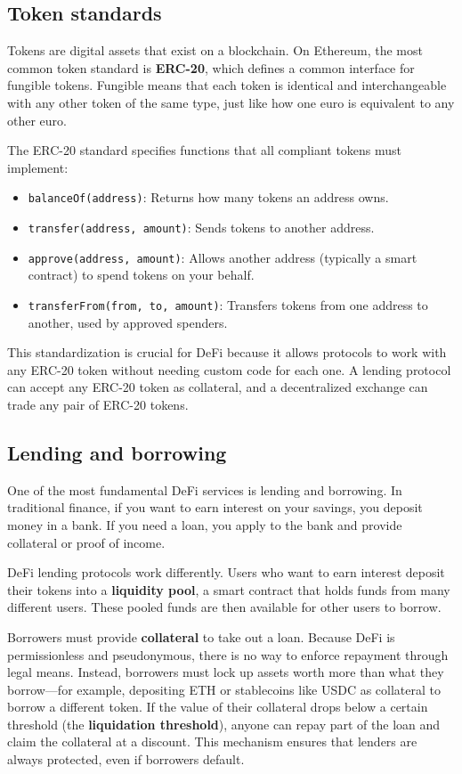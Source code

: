 \subsection{Token standards}

Tokens are digital assets that exist on a blockchain. On Ethereum, the most common token standard is \textbf{ERC-20}, which defines a common interface for fungible tokens. Fungible means that each token is identical and interchangeable with any other token of the same type, just like how one euro is equivalent to any other euro.

The ERC-20 standard specifies functions that all compliant tokens must implement:

\begin{itemize}
    \item \texttt{balanceOf(address)}: Returns how many tokens an address owns.
    \item \texttt{transfer(address, amount)}: Sends tokens to another address.
    \item \texttt{approve(address, amount)}: Allows another address (typically a smart contract) to spend tokens on your behalf.
    \item \texttt{transferFrom(from, to, amount)}: Transfers tokens from one address to another, used by approved spenders.
\end{itemize}

This standardization is crucial for DeFi because it allows protocols to work with any ERC-20 token without needing custom code for each one. A lending protocol can accept any ERC-20 token as collateral, and a decentralized exchange can trade any pair of ERC-20 tokens.

\subsection{Lending and borrowing}

One of the most fundamental DeFi services is lending and borrowing. In traditional finance, if you want to earn interest on your savings, you deposit money in a bank. If you need a loan, you apply to the bank and provide collateral or proof of income.

DeFi lending protocols work differently. Users who want to earn interest deposit their tokens into a \textbf{liquidity pool}, a smart contract that holds funds from many different users. These pooled funds are then available for other users to borrow.

Borrowers must provide \textbf{collateral} to take out a loan. Because DeFi is permissionless and pseudonymous, there is no way to enforce repayment through legal means. Instead, borrowers must lock up assets worth more than what they borrow---for example, depositing ETH or stablecoins like USDC as collateral to borrow a different token. If the value of their collateral drops below a certain threshold (the \textbf{liquidation threshold}), anyone can repay part of the loan and claim the collateral at a discount. This mechanism ensures that lenders are always protected, even if borrowers default.

